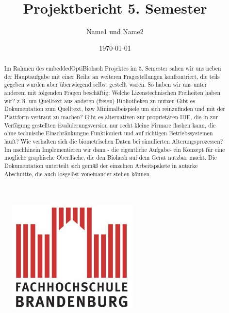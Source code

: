 \documentclass[a4paper,12pt]{scrartcl}
\title{Projektbericht 5. Semester}
\author{Name1 und Name2}
\date{\today}
\begin{document}
\linespread{1.5}
\maketitle 

\begin{abstract} 
\noindent
Im Rahmen des embeddedOptiBiohash Projektes im 5. Semester sahen wir uns neben der Hauptaufgabe mit einer Reihe an weiteren Fragestellungen konfrontriert, die teils gegeben wurden aber \"uberwiegend selbst gestellt waren.
So haben wir uns unter anderem mit folgenden Fragen besch\"aftig:
\newline\noindent
Welche Lizenstechnischen Freiheiten haben wir? z.B. um Quelltext aus anderen (freien) Bibliotheken zu nutzen
\newline\noindent
Gibt es Dokumentation zum Quelltext, bzw Minimalbeispiele um sich reinzufinden und mit der Plattform vertraut zu machen?
\newline\noindent	
Gibt es alternativen zur propriet\"aren IDE, die in zur Verf\"ugung gestellten Evaluierungsversion nur recht kleine Firmare flashen kann, die ohne technische Einschr\"ankungne Funktioniert und auf richtigen Betriebssystemen l\"auft?
\newline\noindent	
Wie verhalten sich die biometrischen Daten bei simulierten Alterungsprozessen?
\newline\noindent	
Im nachhinein Implementieren wir dann - die eigentliche Aufgabe- ein Konzept f\"ur eine m\"ogliche graphische Oberfl\"ache, die den Biohash auf dem Ger\"at nutzbar macht.
Die Dokumentation unterteilt sich gem\"a{\ss} der einzelnen Arbeitspakete in autarke Abschnitte, die auch losgel\"ost voneinander stehen k\"onnen.
\end{abstract}

\begin{figure}
  	\centering
    	\includegraphics[scale=0.25]{img/fhlogo.jpg}
\end{figure}


\newpage
\tableofcontents
\newpage

\newpage

\newpage

\newpage

\newpage

%
%
\newpage
%
\end{document}
